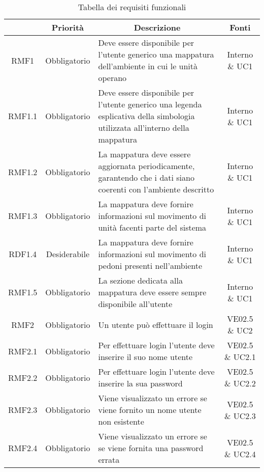 	\newcommand*{\thead}[1]{\multicolumn{1}{c}{\bfseries #1}}	
	\setlength{\tabcolsep}{10pt}
	\begin{longtable}[h!] { c c m{8cm} c}
		\caption{Tabella dei requisiti funzionali} \\
		\rowcolor{lightgray}
		\thead{Requisito} & \thead{Priorità} & \thead{Descrizione} & \thead{Fonti} \\ \endhead%
		
		RMF1 & Obbligatorio & Deve essere disponibile per l'utente generico una mappatura dell'ambiente in cui le unità operano & Interno \& UC1 \\
		
		RMF1.1 & Obbligatorio & Deve essere disponibile per l'utente generico una legenda esplicativa della simbologia utilizzata all'interno della mappatura & Interno \& UC1 \\
		
		RMF1.2 & Obbligatorio & La mappatura deve essere aggiornata periodicamente, garantendo che i dati siano coerenti con l'ambiente descritto & Interno \& UC1 \\
		
		RMF1.3 & Obbligatorio & La mappatura deve fornire informazioni sul movimento di unità facenti parte del sistema & Interno \& UC1 \\
		
		RDF1.4 & Desiderabile & La mappatura deve fornire informazioni sul movimento di pedoni presenti nell'ambiente & Interno \& UC1 \\
		
		RMF1.5 & Obbligatorio & La sezione dedicata alla mappatura deve essere sempre disponibile all'utente & Interno \& UC1 \\
		
		RMF2 & Obbligatorio & Un utente può effettuare il login & VE02.5 \& UC2 \\
		
		RMF2.1 & Obbligatorio & Per effettuare login l'utente deve inserire il suo nome utente & VE02.5 \& UC2.1 \\
		
		RMF2.2 & Obbligatorio & Per effettuare login l'utente deve inserire la sua password & VE02.5 \& UC2.2 \\
		
		RMF2.3 & Obbligatorio & Viene visualizzato un errore se viene fornito un nome utente non esistente & VE02.5 \& UC2.3 \\
		
		RMF2.4 & Obbligatorio & Viene visualizzato un errore se se viene fornita una password errata & VE02.5 \& UC2.4 \\
		

\end{longtable}
